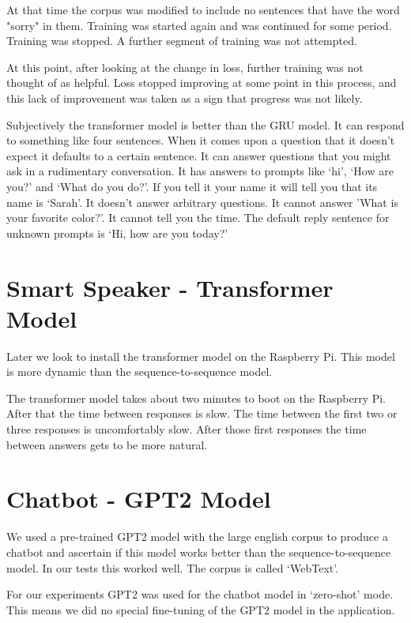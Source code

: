At that time the corpus was modified to include no sentences that have the word "sorry" in them.
Training was started again and was continued for some period. Training was stopped. A further segment of training was not attempted. 

At this point, after looking at the change in loss, further training was not
thought of as helpful. Loss stopped improving at some point in this process, and this lack of
improvement was taken as a sign that progress was not likely.

Subjectively the transformer model is better than the GRU model. It can respond to something like
four sentences. When it comes upon a question that it doesn't expect it defaults to a certain sentence. It can answer questions that you might ask in a rudimentary conversation. It has answers to prompts like `hi', `How are you?' and `What do you do?'. If you tell it your name it will tell you that its name is `Sarah'. It doesn't answer arbitrary questions. It cannot answer 'What is your favorite color?'. It cannot tell you the time. The default reply sentence for unknown prompts is `Hi, how are you today?'

\section{Smart Speaker - Transformer Model}

Later we look to install the transformer model on the Raspberry Pi. This model is more dynamic than the sequence-to-sequence model. 

The transformer model takes about two minutes to boot on the Raspberry Pi. After that the time between responses is slow. The time between the first two or three responses is uncomfortably slow. After those first responses the time between answers gets to be more natural.



\section{Chatbot - GPT2 Model}
We used a pre-trained GPT2 model with the large english corpus to produce a chatbot and ascertain if this model works better than the sequence-to-sequence model. In our tests this worked well. The corpus is called `WebText'.

For our experiments GPT2 was used for the chatbot model in `zero-shot' mode. This means we did no
special fine-tuning of the GPT2 model in the application.


